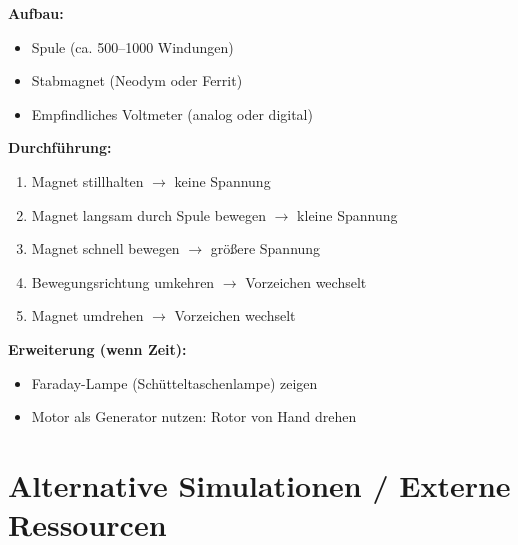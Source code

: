 \documentclass[a4paper,11pt]{article}
\begin{document}
\begin{infobox}
\textbf{Aufbau:}
\begin{itemize}[noitemsep]
    \item Spule (ca. 500--1000 Windungen)
    \item Stabmagnet (Neodym oder Ferrit)
    \item Empfindliches Voltmeter (analog oder digital)
\end{itemize}

\textbf{Durchführung:}
\begin{enumerate}[noitemsep]
    \item Magnet stillhalten $\rightarrow$ keine Spannung
    \item Magnet langsam durch Spule bewegen $\rightarrow$ kleine Spannung
    \item Magnet schnell bewegen $\rightarrow$ größere Spannung
    \item Bewegungsrichtung umkehren $\rightarrow$ Vorzeichen wechselt
    \item Magnet umdrehen $\rightarrow$ Vorzeichen wechselt
\end{enumerate}

\textbf{Erweiterung (wenn Zeit):}
\begin{itemize}[noitemsep]
    \item Faraday-Lampe (Schütteltaschenlampe) zeigen
    \item Motor als Generator nutzen: Rotor von Hand drehen
\end{itemize}
\end{infobox}

\vspace{5mm}

\section*{Alternative Simulationen / Externe Ressourcen}
\end{document}
